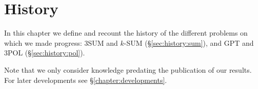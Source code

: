 \chapter{History}

In this chapter we define and recount the history of the different problems on
which we made progress:
%
3SUM and \(k\)-SUM (\S\ref{sec:history:sum}),
and
GPT and 3POL (\S\ref{sec:history:pol}).

Note that we only consider knowledge predating the publication of our results.
For later developments see \S\ref{chapter:developments}.



